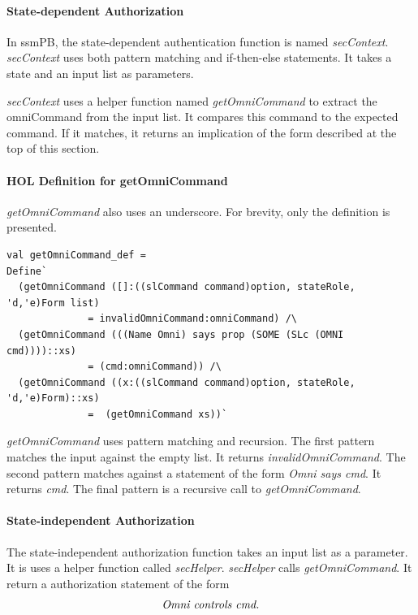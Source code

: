 \documentclass[../../main/main.tex]{subfiles}
\begin{document}
\paragraph*{State-dependent Authorization}
In ssmPB, the state-dependent authentication function is named \textit{secContext}.  \textit{secContext} uses both pattern matching and if-then-else statements. It takes a state and an input list as parameters.

\HOLPBIntegratedDefDefinitionssecContextXXdef

\textit{secContext} uses a helper function named \textit{getOmniCommand} to extract the omniCommand from the input list.  It compares this command to the expected command.  If it matches, it returns an implication of the form described at the top of this section.

\paragraph*{HOL Definition for getOmniCommand}
\textit{getOmniCommand} also uses an underscore.  For brevity, only the  definition is presented.

\begin{lstlisting}
val getOmniCommand_def =
Define`
  (getOmniCommand ([]:((slCommand command)option, stateRole, 'd,'e)Form list)
  		      = invalidOmniCommand:omniCommand) /\
  (getOmniCommand (((Name Omni) says prop (SOME (SLc (OMNI cmd))))::xs)
  		      = (cmd:omniCommand)) /\
  (getOmniCommand ((x:((slCommand command)option, stateRole, 'd,'e)Form)::xs)
  		      =  (getOmniCommand xs))`
\end{lstlisting}

\textit{getOmniCommand}  uses pattern matching and recursion.  The first pattern matches the input against the empty list.  It returns \textit{invalidOmniCommand}.  The second pattern matches against a statement of the form \textit{Omni says cmd}.  It returns \textit{cmd}.  The final pattern is a recursive call to \textit{getOmniCommand}.


\paragraph*{State-independent Authorization}
The state-independent authorization function takes an input list as a parameter.  It is uses a helper function called \textit{secHelper}.  \textit{secHelper} calls \textit{getOmniCommand}.  It return a authorization statement of the form 
\[\text{\textit{Omni controls cmd.}}\]
\end{document}
